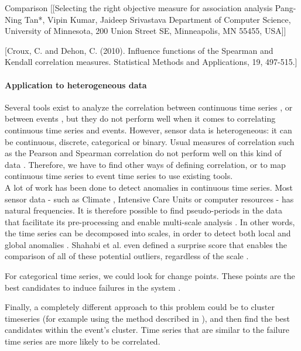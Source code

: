\documentclass[12pt,a4paper]{article}
\begin{document}
Comparison
[[Selecting the right objective measure for association analysis Pang-Ning Tan*, Vipin Kumar, Jaideep Srivastava
Department of Computer Science, University of Minnesota, 200 Union Street SE, Minneapolis, MN 55455, USA]]


[Croux, C. and Dehon, C. (2010). Influence functions of the Spearman and Kendall correlation measures. Statistical Methods and Applications, 19, 497-515.]

\paragraph{Application to heterogeneous data}
Several tools exist to analyze the correlation between continuous time series \cite{tool-continuous}, or between events \cite{tool-event3}, but they do not perform well when it comes to correlating continuous time series and events. However, sensor data is heterogeneous: it can be continuous, discrete, categorical or binary.
Usual measures of correlation such as the Pearson and Spearman correlation do not perform well on this kind of data \cite{incident-diagnosis}.
Therefore, we have to find other ways of defining correlation, or to map continuous time series to event time series to use existing tools.\\

A lot of work has been done to detect anomalies in continuous time series. Most sensor data - such as Climate \cite{climate}, Intensive Care Units \cite{icu} or computer resources \cite{incident-diagnosis} - has natural frequencies.
It is therefore possible to find pseudo-periods in the data that facilitate its pre-processing and enable multi-scale analysis \cite{multiscale-timeseries}.
In other words, the time series can be decomposed into scales, in order to detect both local \cite{anomaly-1, anomaly-2, anomaly-3} and global anomalies \cite{lof, global-local-outliers}.
Shahabi et al. even defined a surprise score that enables the comparison of all of these potential outliers, regardless of the scale \cite{multilevel-surprise}.

For categorical time series, we could look for change points. These points are the best candidates to induce failures in the system \cite{categorical-time-series, detect-change-points}.

Finally, a completely different approach to this problem could be to cluster timeseries (for example using the method described in \cite{parameter-free-clustering}), and then find the best candidates within the event's cluster. Time series that are similar to the failure time series are more likely to be correlated. \\
\end{document}
